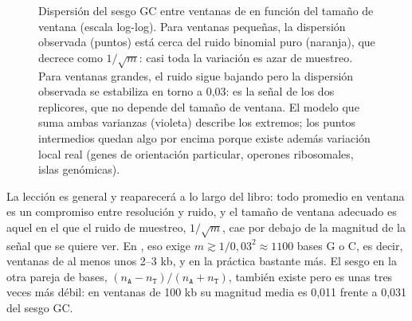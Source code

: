 \begin{figure}[t]
\centering
{}
\caption[Ruido del sesgo según el tamaño de ventana]{Dispersión del sesgo GC entre ventanas de  en función del tamaño de ventana (escala log-log). Para ventanas pequeñas, la dispersión observada (puntos) está cerca del ruido binomial puro (naranja), que decrece como $1/\sqrt{m}$: casi toda la variación es azar de muestreo. Para ventanas grandes, el ruido sigue bajando pero la dispersión observada se estabiliza en torno a 0,03: es la señal de los dos replicores, que no depende del tamaño de ventana. El modelo que suma ambas varianzas (violeta) describe los extremos; los puntos intermedios quedan algo por encima porque existe además variación local real (genes de orientación particular, operones ribosomales, islas genómicas).}
\label{fig:01-ruido}
\end{figure}

La lección es general y reaparecerá a lo largo del libro: todo promedio en ventana es un compromiso entre resolución y ruido, y el tamaño de ventana adecuado es aquel en el que el ruido de muestreo, $1/\sqrt{m}$, cae por debajo de la magnitud de la señal que se quiere ver. En , eso exige $m\gtrsim 1/0{,}03^2\approx1100$ bases G o C, es decir, ventanas de al menos unos 2--3 kb, y en la práctica bastante más. El sesgo en la otra pareja de bases, $(n_\texttt{A}-n_\texttt{T})/(n_\texttt{A}+n_\texttt{T})$, también existe pero es unas tres veces más débil: en ventanas de 100 kb su magnitud media es 0,011 frente a 0,031 del sesgo GC.

